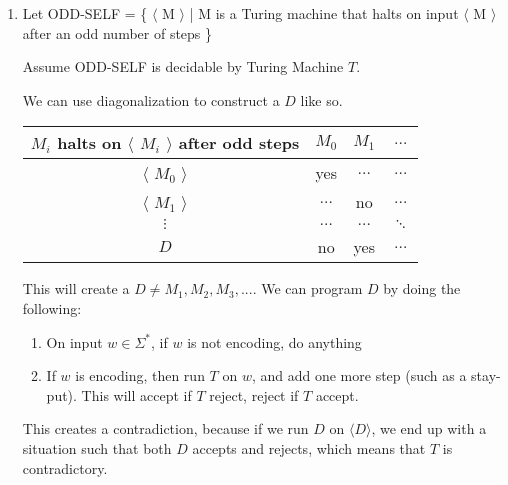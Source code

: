 \documentclass[11pt]{article}
\theoremstyle{definition}
\theoremstyle{case}
\theoremstyle{theorem}
\begin{document}
\begin{enumerate}[label=(\alph*)]

\item Let 
ODD-SELF = \{ $\langle$ M $\rangle$ | M is a Turing machine that halts on input $\langle$ M $\rangle$ after an odd number of steps \}

Assume ODD-SELF is decidable by Turing Machine $T$. 

We can use diagonalization to construct a $D$ like so. 

\begin{tabular}{|c||c|c|c|}

$M_i$ halts on $\langle$ $M_i$ $\rangle$ after odd steps & $M_0$ & $M_1$ & $\hdots$ \\

\hline
\hline

$\langle$ $M_0$ $\rangle$ & yes & $\hdots$ & $\hdots$ \\

\hline

$\langle$ $M_1$ $\rangle$ & $\hdots$ & no & $\hdots$ \\

\hline

$\vdots$ & $\hdots$ & $\hdots$ & $\ddots$ \\

\hline
\hline

$D$ & no & yes & $\hdots$ \\

\end{tabular}

This will create a $D \neq M_1, M_2, M_3, ...$. We can program $D$ by doing the following:

\begin{enumerate}[label=(\alph*)]

\item On input $w \in \Sigma^*$, if $w$ is not encoding, do anything

\item If $w$ is encoding, then run $T$ on $w$, and add one more step (such as a stay-put). 
This will accept if $T$ reject, reject if $T$ accept. 

\end{enumerate}

This creates a contradiction, because if we run $D$ on $\langle D \rangle$, we 
end up with a situation such that both $D$ accepts and rejects, which means that $T$ is 
contradictory.

\newpage


\end{enumerate}
\end{document}
